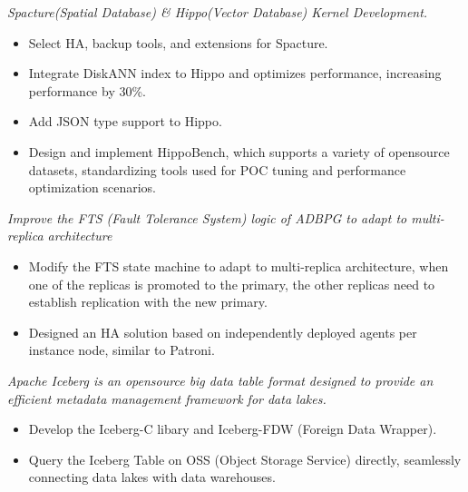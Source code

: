\documentclass{resume}
\begin{document}
\textit{Spacture(Spatial Database) \& Hippo(Vector Database) Kernel Development.}
\begin{onehalfspacing}
\begin{itemize}
  \item Select HA, backup tools, and extensions for Spacture.
  \item Integrate DiskANN index to Hippo and optimizes performance, increasing performance by 30\%.
  \item Add JSON type support to Hippo.
  \item Design and implement HippoBench, which supports a variety of opensource datasets, standardizing tools used for POC tuning and performance optimization scenarios.
\end{itemize}
\end{onehalfspacing}

\textit{Improve the FTS (Fault Tolerance System) logic of ADBPG to adapt to multi-replica architecture}
\begin{onehalfspacing}
\begin{itemize}
  \item Modify the FTS state machine to adapt to multi-replica architecture, when one of the replicas is promoted to the primary, the other replicas need to establish replication with the new primary.
  \item Designed an HA solution based on independently deployed agents per instance node, similar to Patroni.
\end{itemize}
\end{onehalfspacing}

\textit{Apache Iceberg is an opensource big data table format designed to provide an efficient metadata management framework for data lakes.}
\begin{onehalfspacing}
\begin{itemize}
  \item Develop the Iceberg-C libary and Iceberg-FDW (Foreign Data Wrapper).
  \item Query the Iceberg Table on OSS (Object Storage Service) directly, seamlessly connecting data lakes with data warehouses.
\end{itemize}
\end{onehalfspacing}
\end{document}
